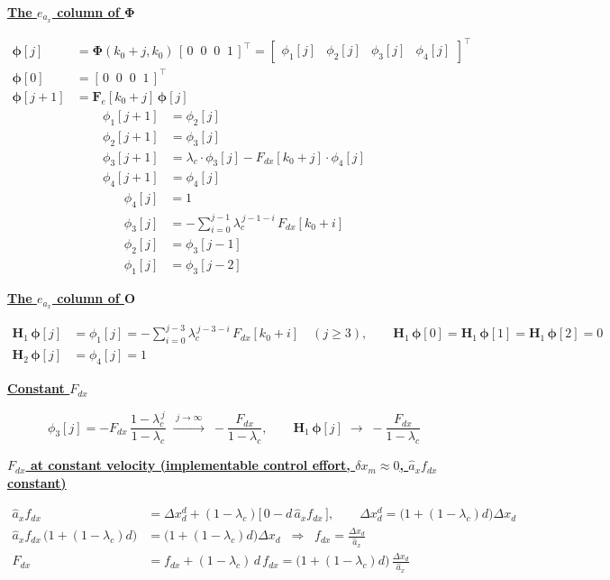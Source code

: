 \documentclass[11pt,a4paper]{ctexart}
\newcommand{\lc}{\lambda_c}
\newcommand{\hd}[1]{\par\medskip\noindent\underline{\textbf{#1}}\par\nobreak\vspace{0.2ex}}
\begin{document}
\hd{The $e_{a_x}$ column of $\bm{\Phi}$}
\[
\begin{aligned}
\bm{\phi}[j] &= \bm{\Phi}(k_0+j,k_0)\,[\,0\;\;0\;\;0\;\;1\,]^{\top} = \begin{bmatrix} \phi_1[j] & \phi_2[j] & \phi_3[j] & \phi_4[j] \end{bmatrix}^{\top} \\
\bm{\phi}[0] &= [\,0\;\;0\;\;0\;\;1\,]^{\top} \\
\bm{\phi}[j+1] &= \mathbf{F}_e[k_0+j]\,\bm{\phi}[j]
\end{aligned}
\]
\[
\begin{aligned}
\phi_1[j+1] &= \phi_2[j] \\
\phi_2[j+1] &= \phi_3[j] \\
\phi_3[j+1] &= \lc \cdot \phi_3[j] - F_{dx}[k_0+j]\cdot\phi_4[j] \\
\phi_4[j+1] &= \phi_4[j]
\end{aligned}
\]
\[
\begin{aligned}
\phi_4[j] &= 1 \\
\phi_3[j] &= -\textstyle\sum_{i=0}^{j-1} \lc^{\,j-1-i}\,F_{dx}[k_0+i] \\
\phi_2[j] &= \phi_3[j-1] \\
\phi_1[j] &= \phi_3[j-2]
\end{aligned}
\]

\hd{The $e_{a_x}$ column of $\mathbf{O}$}
\[
\begin{aligned}
\mathbf{H}_1\,\bm{\phi}[j] &= \phi_1[j] = -\textstyle\sum_{i=0}^{j-3} \lc^{\,j-3-i}\,F_{dx}[k_0+i] \quad (j \ge 3), \qquad \mathbf{H}_1\,\bm{\phi}[0] = \mathbf{H}_1\,\bm{\phi}[1] = \mathbf{H}_1\,\bm{\phi}[2] = 0 \\
\mathbf{H}_2\,\bm{\phi}[j] &= \phi_4[j] = 1
\end{aligned}
\]

\hd{Constant $F_{dx}$}
\[
\phi_3[j] = -F_{dx}\,\frac{1-\lc^{\,j}}{1-\lc} \;\xrightarrow{\;j \to \infty\;}\; -\frac{F_{dx}}{1-\lc}, \qquad
\mathbf{H}_1\,\bm{\phi}[j] \;\to\; -\frac{F_{dx}}{1-\lc}
\]

\hd{$F_{dx}$ at constant velocity (implementable control effort, $\delta x_m \approx 0$, $\hat a_x f_{dx}$ constant)}
\[
\begin{aligned}
\hat a_x f_{dx} &= \Delta x_d^{d} + (1-\lc)\big[\,0 - d\,\hat a_x f_{dx}\,\big], \qquad \Delta x_d^{d} = \big(1 + (1-\lc)d\big)\Delta x_d \\
\hat a_x f_{dx}\,\big(1 + (1-\lc)d\big) &= \big(1 + (1-\lc)d\big)\Delta x_d \;\;\Rightarrow\;\; f_{dx} = \frac{\Delta x_d}{\hat a_x} \\
F_{dx} &= f_{dx} + (1-\lc)\,d\,f_{dx} = \big(1 + (1-\lc)d\big)\,\frac{\Delta x_d}{\hat a_x}
\end{aligned}
\]
\end{document}
